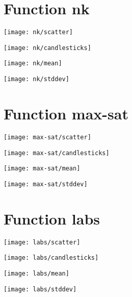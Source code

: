 \section{Function nk}
\begin{center}
\texttt{[image: nk/scatter]}
\end{center}
\begin{center}
\texttt{[image: nk/candlesticks]}
\end{center}
\begin{center}

\end{center}
\begin{center}
\texttt{[image: nk/mean]}
\end{center}
\begin{center}
\texttt{[image: nk/stddev]}
\end{center}
\newpage
\section{Function max-sat}
\begin{center}
\texttt{[image: max-sat/scatter]}
\end{center}
\begin{center}
\texttt{[image: max-sat/candlesticks]}
\end{center}
\begin{center}

\end{center}
\begin{center}
\texttt{[image: max-sat/mean]}
\end{center}
\begin{center}
\texttt{[image: max-sat/stddev]}
\end{center}
\newpage
\section{Function labs}
\begin{center}
\texttt{[image: labs/scatter]}
\end{center}
\begin{center}
\texttt{[image: labs/candlesticks]}
\end{center}
\begin{center}

\end{center}
\begin{center}
\texttt{[image: labs/mean]}
\end{center}
\begin{center}
\texttt{[image: labs/stddev]}
\end{center}
\newpage
